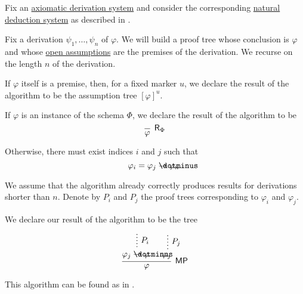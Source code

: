 \begin{algorithm}\label{alg:axiomatic_derivation_to_proof_tree}
  Fix an \hyperref[def:axiomatic_derivation_system]{axiomatic derivation system} and consider the corresponding \hyperref[def:abstract_natural_deduction_system]{natural deduction system} as described in .

  Fix a derivation \( \psi_1, \ldots, \psi_n \) of \( \varphi \). We will build a proof tree whose conclusion is \( \varphi \) and whose \hyperref[def:natural_deduction_proof_tree/open]{open assumptions} are the premises of the derivation. We recurse on the length \( n \) of the derivation.

  \begin{thmenum}
     If \( \varphi \) itself is a premise, then, for a fixed marker \( u \), we declare the result of the algorithm to be the assumption tree \( [\varphi]^u \).

     If \( \varphi \) is an instance of the schema \( \Phi \), we declare the result of the algorithm to be
    \begin{equation*}
      \begin{prooftree}
        \infer0[\ensuremath{ \logic{R}_\Phi }]{ \varphi }
      \end{prooftree}
    \end{equation*}

     Otherwise, there must exist indices \( i \) and \( j \) such that
    \begin{equation*}
      \varphi_i = \varphi_j \synimplies \varphi_n.
    \end{equation*}

    We assume that the algorithm already correctly produces results for derivations shorter than \( n \). Denote by \( P_i \) and \( P_j \) the proof trees corresponding to \( \varphi_i \) and \( \varphi_j \).

    We declare our result of the algorithm to be the tree
    \begin{equation*}
      \begin{prooftree}
        \hypo{}
        \ellipsis { \( P_i \) } { \varphi_j \synimplies \varphi }

        \hypo{}
        \ellipsis { \( P_j \) } { \varphi_j }

        \infer2[\logic{MP}]{ \varphi }
      \end{prooftree}
    \end{equation*}
  \end{thmenum}
\end{algorithm}
\begin{comments}
  \item This algorithm can be found as  in \cite{notebook:code}.
\end{comments}

